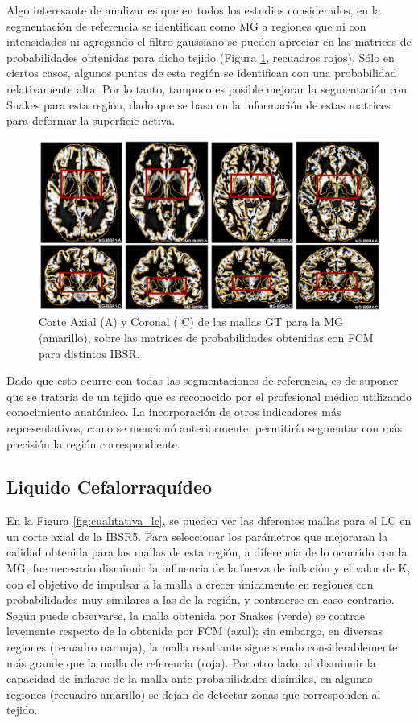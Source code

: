 Algo interesante de analizar es que en todos los estudios considerados, en la segmentación de referencia se identifican como MG a regiones que ni con intensidades ni agregando el filtro gaussiano se pueden apreciar en las matrices de probabilidades obtenidas para dicho tejido (Figura \ref{fig:cualitativa_mg_2}, recuadros rojos). Sólo en ciertos casos, algunos puntos de esta región se identifican con una probabilidad relativamente alta. Por lo tanto, tampoco es posible mejorar la segmentación con Snakes para esta región, dado que se basa en la información de estas matrices para deformar la superficie activa.


\begin{figure}[H]
	\centering
	\includegraphics[scale=0.6]{images/MG_probVsGT.jpg}
	\caption{Corte Axial (A) y Coronal ( C) de las mallas GT para la MG (amarillo), sobre las matrices de probabilidades obtenidas con FCM para distintos IBSR.}
	\label{fig:cualitativa_mg_2}
\end{figure}

Dado que esto ocurre con todas las segmentaciones de referencia, es de suponer que se trataría de un tejido que es reconocido por el profesional médico utilizando conocimiento anatómico. La incorporación de otros indicadores más representativos, como se mencionó anteriormente, permitiría segmentar con más precisión la región correspondiente.

\subsection{Liquido Cefalorraquídeo}

En la Figura \ref{fig:cualitativa_lc}, se pueden ver las diferentes mallas para el LC en un corte axial de la IBSR5.  Para seleccionar los parámetros que mejoraran la calidad obtenida para las mallas de esta región, a diferencia de lo ocurrido con la MG, fue necesario disminuir la influencia de la fuerza de inflación y el valor de K, con el objetivo de impulsar a la malla a crecer únicamente en regiones con probabilidades muy similares a las de la región, y contraerse en caso contrario. Según puede observarse, la malla obtenida por Snakes (verde) se contrae levemente respecto de la obtenida por FCM (azul); sin embargo, en diversas regiones (recuadro naranja), la malla resultante sigue siendo considerablemente más grande que la malla de referencia (roja). Por otro lado, al disminuir la capacidad de inflarse de la malla ante probabilidades disímiles, en algunas regiones (recuadro amarillo) se dejan de detectar zonas que corresponden al tejido.

